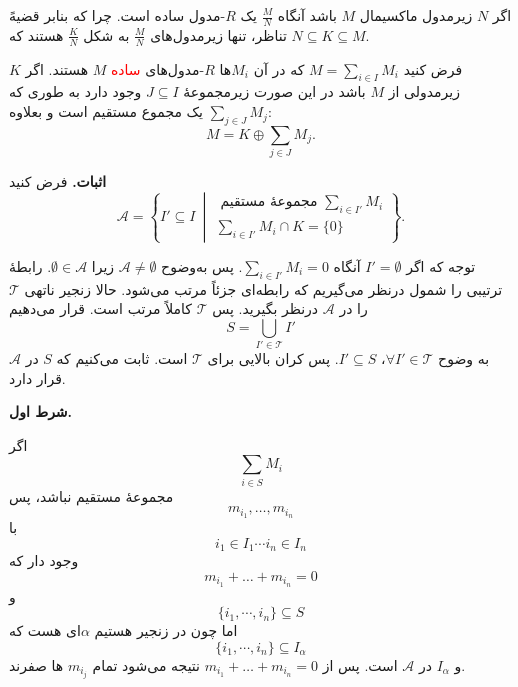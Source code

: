 \begin{frame}
    \begin{remark}
        اگر $N$ زیرمدول ماکسیمال $M$ باشد آنگاه $\frac{M}{N}$ یک $R$-مدول ساده است.
        چرا که بنابر قضیهً تناظر، تنها زیرمدول‌های $\frac{M}{N}$ به شکل $\frac{K}{N}$ هستند که $N \subseteq K \subseteq M$.

    \end{remark}


    \begin{theorem}
        فرض کنید $M = \sum_{i \in I} M_i$ که در آن $M_i$ها $R$-مدول‌های \textcolor{red}{ساده}  \(M\) هستند. اگر $K$ زیرمدولی از $M$ باشد در این صورت زیرمجموعهٔ $J \subseteq I$ وجود دارد به طوری که
        \(\sum_{j \in J} M_j\)
        یک مجموع مستقیم است و بعلاوه:
        \[
            M = K \oplus \sum_{j \in J} M_j.
        \]


    \end{theorem}
    \textbf{اثبات.} فرض کنید
    \[
        \mathcal{A} = \left\{ I' \subseteq I \ \middle|
        \begin{aligned}
            \text{ مجموعهٔ مستقیم  } \sum_{i \in I'} M_i \\
            \sum_{i \in I'} M_i \cap K = \{0\}
        \end{aligned} \right\}.
    \]

\end{frame}


\begin{frame}
    توجه که اگر
    $I' = \emptyset$
    آنگاه
    $\sum_{i \in I'} M_i = 0$.
    پس به‌وضوح
    $\mathcal{A} \neq \emptyset$
    زیرا
    $\emptyset \in \mathcal{A}$.
    رابطهٔ ترتیبی را شمول درنظر می‌گیریم که رابطه‌ای جزئاً مرتب می‌شود. حالا زنجیر ناتهی
    $\mathcal{T}$
    را در
    $\mathcal{A}$
    درنظر بگیرید. پس
    $\mathcal{T}$
    کاملاً مرتب است.
    قرار می‌دهیم
    \[
        S = \bigcup_{I' \in \mathcal{T}} I'
    \]
    به وضوح
    $\forall I' \in \mathcal{T}$، $I' \subseteq S$.
    پس کران  بالایی برای
    \(\mathcal{T}\)
    است. ثابت می‌کنیم که
    \(S\)
    در
    \(\mathcal{A}\)
    قرار دارد.


\end{frame}



\begin{frame}
    \textbf{شرط اول.}



    اگر
    \[
        \sum_{i \in S} M_i
    \]
    مجموعهٔ مستقیم نباشد، پس
    \[
        m_{i_1}, \dots, m_{i_n}
    \]
    با
    \[
        i_1 \in I_1 \cdots i_n \in I_n
    \]
    وجود دار که
    \[
        m_{i_1} + \dots + m_{i_n} = 0
    \]
    و
    \[
        \{i_1, \cdots, i_n\} \subseteq S
    \]
    اما چون در زنجیر هستیم
    \(\alpha\)ای
    هست که
    \[
        \{i_1, \cdots, i_n\} \subseteq I_\alpha
    \]
    و
    \(I_\alpha\)
    در
    \(\mathcal{A}\)
    است. پس از
    $m_{i_1} + \dots + m_{i_n} = 0$
    نتیجه می‌شود تمام
    \(m_{i_j}\)
    ها صفرند.

\end{frame}


